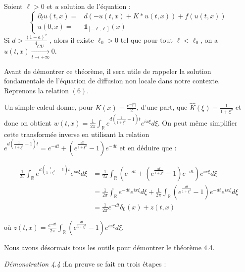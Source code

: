 \documentclass{article}
\begin{document}
\begin{Theoreme}Soient $\ell>0$ et $u$ solution de l'équation :
\begin{equation}
\left\{
  \begin{array}{cc}
   \partial_t u(t,x) =&  d(-u(t,x)+K*u(t,x))+f(u(t,x)) \\
   u(0,x) = & \mathds{1}_{[-\ell,\ell]}(x)~~~~~~~~~~~~~~~~~~~~~~~~~~~~~~~~~~~~~~~~~~~~~~~
   \end{array}
   \right.
   \end{equation}
Si $d > \frac{(1-a)^2}{4}$ , alors il existe $\ell_0 > 0$ tel que pour tout $\ell<\ell_0$, on a $u(t,x) \underset{t \to +\infty}{\overset{CU}{\longrightarrow}}0$. \end{Theoreme}


Avant de démontrer ce théorème, il sera utile de rappeler la solution fondamentale de l'équation de diffusion non locale dans notre contexte. Reprenons la relation $(6)$.
  	
Un simple calcul donne, pour $K(x) = \frac{e^{-|x|}}{2} $, d'une part, que $\widehat{K}(\xi) = \frac{1}{1+\xi^2}$ et donc on obtient $w(t,x) = \frac{1}{2\pi} \int_{\mathbb{R}} e^{d(\frac{1}{1+\xi^2}-1)t} e^{ix \xi} d\xi$. On peut même simplifier cette transformée inverse en utilisant la relation $e^{d(\frac{1}{1+\xi^2}-1)t} = e^{-dt} + (e^{\frac{dt}{1+\xi^2}}-1)e^{-dt}$ et en déduire que :

\begin{equation}
\begin{split}
\frac{1}{2\pi} \int_{\mathbb{R}} e^{d(\frac{1}{1+\xi^2}-1)t} e^{ix \xi} d\xi & = \frac{1}{2\pi} \int_{\mathbb{R}} (e^{-dt} + (e^{\frac{dt}{1+\xi^2}}-1)e^{-dt}) e^{ix \xi} d\xi \\ 
& = \frac{1}{2\pi} \int_{\mathbb{R}} e^{-dt}e^{ix\xi} d\xi + \frac{1}{2\pi} \int_{\mathbb{R}}(e^{\frac{dt}{1+\xi^2}}-1)e^{-dt} e^{ix \xi} d\xi \\ 
& = \frac{1}{2\pi} e^{-dt}\delta_0(x) + z(t,x)
\end{split}
\end{equation}

\noindent où $z(t,x) = \frac{e^{-dt}}{2\pi} \int_{\mathbb{R}}(e^{\frac{dt}{1+\xi^2}}-1) e^{ix \xi} d\xi$.

\noindent Nous avons désormais tous les outils pour démontrer le théorème 4.4.\newline

\noindent \textit{Démonstration 4.4} :La preuve se fait en trois étapes : \newline
\end{document}
